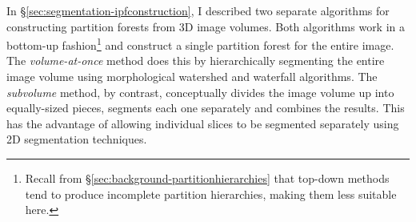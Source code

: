 In \S\ref{sec:segmentation-ipfconstruction}, I described two separate algorithms for constructing partition forests from 3D image volumes. Both algorithms work in a bottom-up fashion\footnote{Recall from \S\ref{sec:background-partitionhierarchies} that top-down methods tend to produce incomplete partition hierarchies, making them less suitable here.} and construct a single partition forest for the entire image. The \emph{volume-at-once} method does this by hierarchically segmenting the entire image volume using morphological watershed and waterfall algorithms. The \emph{subvolume} method, by contrast, conceptually divides the image volume up into equally-sized pieces, segments each one separately and combines the results. This has the advantage of allowing individual slices to be segmented separately using 2D segmentation techniques.

